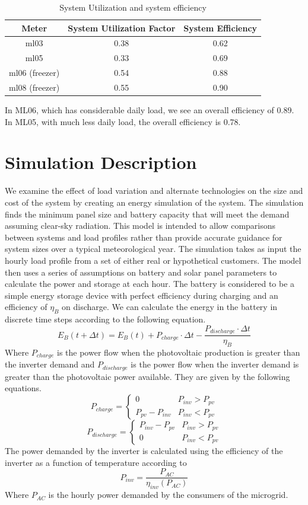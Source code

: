 \documentclass[conference]{IEEEtran}
\newcommand{\ppv}{P_{pv}}
\newcommand{\pinv}{P_{inv}}
\begin{document}
\begin{table}
\centering
\begin{tabular}{c c c}
Meter & System Utilization Factor & System Efficiency \\
\hline
ml03 & 0.38 & 0.62 \\
ml05 & 0.33 & 0.69 \\
ml06 (freezer) & 0.54 & 0.88 \\
ml08 (freezer) & 0.55 & 0.90 \\
\end{tabular}
\caption{System Utilization and system efficiency}
\label{efficiency}
\end{table}

In ML06, which has considerable daily load, we see an overall
efficiency of 0.89.
In ML05, with much less daily load, the overall efficiency
is 0.78.

\section{Simulation Description}

We examine the effect of load variation and alternate technologies
on the size and cost of the system by creating an 
energy simulation of the system.
The simulation finds the minimum panel size and battery capacity
that will meet the demand assuming clear-sky radiation.
This model is intended to allow comparisons between systems and
load profiles rather than provide accurate guidance for system
sizes over a typical meteorological year.
The simulation takes as input the hourly load profile from a
set of either real or hypothetical customers.
The model then uses a series of assumptions on battery and solar
panel parameters to calculate the power and storage at each hour.
The battery is considered to be a simple energy storage device
with perfect efficiency during charging and an efficiency of
$\eta_B$ on discharge.
We can calculate the energy in the battery in discrete time
steps according to the following equation.
%
$$ E_B(t+\Delta t) = E_B(t)
                   + P_{charge} \cdot \Delta t
                   - \frac{P_{discharge} \cdot \Delta t}{\eta_B}
                   $$
%
Where $P_{charge}$ is the power flow when the photovoltaic
production is greater than the inverter demand and
$P_{discharge}$ is the power flow when the inverter demand
is greater than the photovoltaic power available.
They are given by the following equations.
%
$$ P_{charge} = \left\{
			  \begin{array}{rl}
			  0 & \pinv > \ppv \\
			  \ppv - \pinv & \pinv < \ppv
			  \end{array}
			  \right. $$
%
$$ P_{discharge} = \left\{
			  \begin{array}{rl}
			  \pinv - \ppv & \pinv > \ppv \\
			  0 & \pinv < \ppv
			  \end{array}
			  \right. $$
%
The power demanded by the inverter is calculated using the efficiency
of the inverter as a function of temperature according to
$$ \pinv = \frac{P_{AC}}{\eta_{inv}(P_{AC})} $$
%
Where $P_{AC}$ is the hourly power demanded by the consumers of the microgrid.
\end{document}
